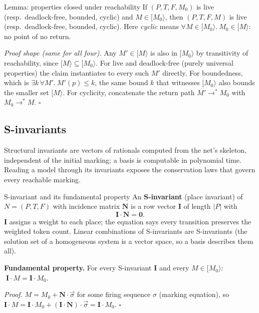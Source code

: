 \begin{notebox}{Lemma: properties closed under reachability}
If $(P, T, F, M_0)$ is live (resp.\ deadlock-free, bounded, cyclic) and $M \in [M_0\rangle$, then $(P, T, F, M)$ is live (resp.\ deadlock-free, bounded, cyclic). Here \emph{cyclic} means $\forall M \in [M_0\rangle.\ M_0 \in [M\rangle$: no point of no return.
\par\smallskip
\textit{Proof shape (same for all four).} Any $M' \in [M\rangle$ is also in $[M_0\rangle$ by transitivity of reachability, since $[M\rangle \subseteq [M_0\rangle$. For live and deadlock-free (purely universal properties) the claim instantiates to every such $M'$ directly. For boundedness, which is $\exists k\, \forall M'.\ M'(p) \leq k$, the same bound $k$ that witnesses $[M_0\rangle$ also bounds the smaller set $[M\rangle$. For cyclicity, concatenate the return path $M' \to^\ast M_0$ with $M_0 \to^\ast M$. \hfill$\square$
\end{notebox}

\subsection{S-invariants}

Structural invariants are vectors of rationals computed from the net's skeleton, independent of the initial marking; a basis is computable in polynomial time. Reading a model through its invariants exposes the conservation laws that govern every reachable marking.

\begin{definitionbox}{S-invariant and its fundamental property}
An \textbf{S-invariant} (place invariant) of $N = (P, T, F)$ with incidence matrix $\mathbf{N}$ is a row vector $\mathbf{I}$ of length $|P|$ with
\[
  \mathbf{I} \cdot \mathbf{N} = \mathbf{0}.
\]
$\mathbf{I}$ assigns a weight to each place; the equation says every transition preserves the weighted token count. Linear combinations of S-invariants are S-invariants (the solution set of a homogeneous system is a vector space, so a basis describes them all).
\par\smallskip
\textbf{Fundamental property.} For every S-invariant $\mathbf{I}$ and every $M \in [M_0\rangle$: $\;\mathbf{I} \cdot M = \mathbf{I} \cdot M_0$.
\par\smallskip
\textit{Proof.} $M = M_0 + \mathbf{N} \cdot \vec{\sigma}$ for some firing sequence $\sigma$ (marking equation), so $\mathbf{I} \cdot M = \mathbf{I} \cdot M_0 + (\mathbf{I} \cdot \mathbf{N}) \cdot \vec{\sigma} = \mathbf{I} \cdot M_0$. \hfill$\square$
\end{definitionbox}

